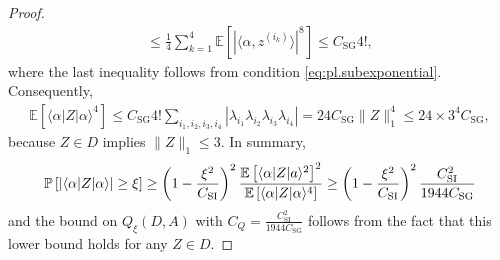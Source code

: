 \begin{proof}
\begin{align}
    \leq \frac{1}{4} \sum_{k=1}^4 \mathbb{E} \left[ | \langle  \alpha,  z^{(i_k)} \rangle|^8 \right]
    \leq C_\mathrm{SG} 4!,
  \end{align}
  where the last inequality follows from condition \eqref{eq:pl.subexponential}.
  Consequently,
  \begin{align}
    \mathbb{E} \left[ \langle  \alpha|  Z |  \alpha\rangle^4 \right]
    \leq C_\mathrm{SG} 4! \sum_{i_1,i_2,i_3,i_4} | \lambda_{i_1} \lambda_{i_2} \lambda_{i_3} \lambda_{i_4} |
    = 24 C_\mathrm{SG} \|  Z \|_1^4 \leq 24 \times 3^4 C_\mathrm{SG},
  \end{align}
  because $ Z \in D$ implies $\|  Z \|_1 \leq 3$.
  In summary,
  \begin{align}
    \mathbb{P} \left[ | \langle  \alpha|  Z | \alpha \rangle| \geq \xi \right]
    \geq \left(1-\frac{\xi^2}{C_\mathrm{SI}}\right)^2 \frac{\mathbb{E} \left[ \langle  \alpha|  Z | a \rangle^2 \right]^2}{\mathbb{E} \left[ \langle  \alpha|  Z | \alpha \rangle^4 \right]}
    \geq \left(1-\frac{\xi^2}{C_\mathrm{SI}}\right)^2 \frac{C_\mathrm{SI}^2}{1944C_\mathrm{SG}}
  \end{align}
  and the bound on $Q_\xi (D, A)$ with $C_Q = \frac{C_\mathrm{SI}^2}{1944 C_\mathrm{SG}}$ follows from the fact that this lower bound holds for any $ Z \in D$.
\end{proof}


